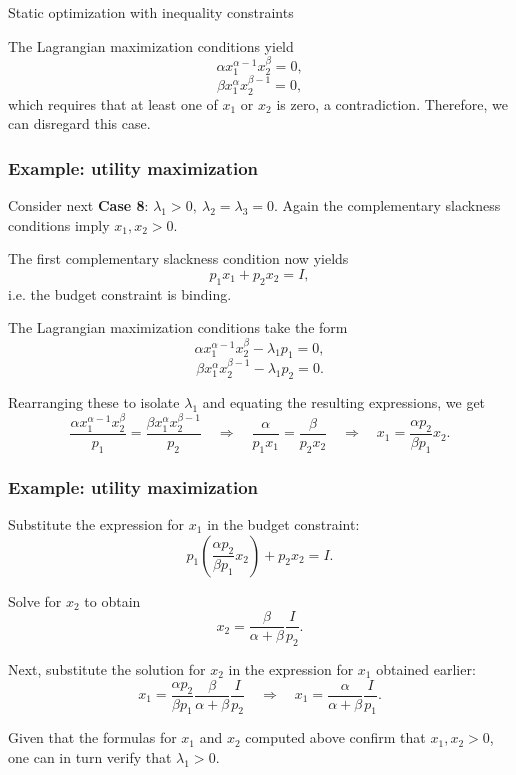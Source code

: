 \documentclass[10pt]{beamer}
\theoremstyle{definition}
\begin{document}
\begin{section}{Static optimization with inequality constraints}
\begin{frame}[fragile]
The Lagrangian maximization conditions yield 
\[ \alpha x_1^{\alpha-1} x_2^\beta = 0, \]
\[ \beta x_1^\alpha x_2^{\beta-1} =0, \] which requires that at least one of $ x_1 $ or $ x_2 $ is zero, a contradiction. Therefore, we can disregard this case.
\end{frame}

\begin{frame}[fragile]
\frametitle{Example: utility maximization}
Consider next \textbf{Case 8}: $ \lambda_1>0,~\lambda_2=\lambda_3=0 $. Again the complementary slackness conditions imply $ x_1,x_2>0 $.

The first complementary slackness condition now yields \[ p_1 x_1 + p_2 x_2 = I,  \]
i.e. the budget constraint is binding.

The Lagrangian maximization conditions take the form 
\[ \alpha x_1^{\alpha-1} x_2^\beta -\lambda_1 p_1 = 0, \]
\[ \beta x_1^\alpha x_2^{\beta-1} -\lambda_1 p_2 = 0. \] 

Rearranging these to isolate $ \lambda_1 $ and equating the resulting expressions, we get
\[ \dfrac{\alpha x_1^{\alpha-1}x_2^\beta}{p_1} = \dfrac{\beta x_1^{\alpha}x_2^{\beta-1}}{p_2} \quad \Rightarrow \quad \dfrac{\alpha}{p_1 x_1} = \dfrac{\beta}{p_2 x_2} \quad \Rightarrow \quad x_1 = \dfrac{\alpha p_2}{\beta p_1}x_2. \]
\end{frame}

\begin{frame}[fragile]
\frametitle{Example: utility maximization}
Substitute the expression for $ x_1 $ in the budget constraint: 
\[ p_1 \left(\dfrac{\alpha p_2}{\beta p_1}x_2\right) + p_2 x_2 = I. \]

Solve for $ x_2 $ to obtain \[ x_2 = \dfrac{\beta}{\alpha+\beta}\dfrac{I}{p_2}. \]

Next, substitute the solution for $ x_2 $ in the expression for $ x_1 $ obtained earlier:
\[ x_1 = \dfrac{\alpha p_2}{\beta p_1}\dfrac{\beta}{\alpha+\beta}\dfrac{I}{p_2} \quad \Rightarrow \quad x_1 = \dfrac{\alpha}{\alpha+\beta}\dfrac{I}{p_1}. \]\bigskip

Given that the formulas for $ x_1 $ and $ x_2 $ computed above confirm that $ x_1,x_2>0 $, one can in turn verify that $ \lambda_1 > 0 $.
\end{frame}


\end{section}
\end{document}
